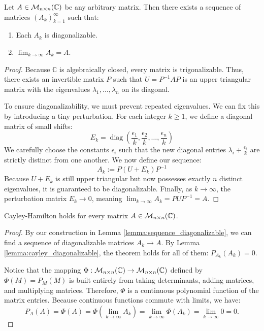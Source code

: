 \begin{lemma}\label{lemma:sequence_diagonalizable}
  Let $A \in \mathcal{M}_{n \times n}(\mathbb{C})$ be any arbitrary matrix. Then there exists a sequence of matrices $(A_k)_{k=1}^\infty$ such that:
  \begin{enumerate}
    \item Each $A_k$ is diagonalizable.
    \item $\lim_{k \to \infty} A_k = A$.
  \end{enumerate}
\end{lemma}

\begin{proof}
  Because $\mathbb{C}$ is algebraically closed, every matrix is trigonalizable. Thus, there exists an invertible matrix $P$ such that $U = P^{-1} A P$ is an upper triangular matrix with the eigenvalues $\lambda_1, \dots, \lambda_n$ on its diagonal.

  To ensure diagonalizability, we must prevent repeated eigenvalues. We can fix this by introducing a tiny perturbation. For each integer $k \ge 1$, we define a diagonal matrix of small shifts:
  \[
  E_k = \operatorname{diag}\left(\frac{\epsilon_1}{k}, \frac{\epsilon_2}{k}, \dots, \frac{\epsilon_n}{k}\right)
  \]
  We carefully choose the constants $\epsilon_i$ such that the new diagonal entries $\lambda_i + \frac{\epsilon_i}{k}$ are strictly distinct from one another. We now define our sequence:
  \[
  A_k := P (U + E_k) P^{-1}
  \]
  Because $U + E_k$ is still upper triangular but now possesses exactly $n$ distinct eigenvalues, it is guaranteed to be diagonalizable. Finally, as $k \to \infty$, the perturbation matrix $E_k \to 0$, meaning $\lim_{k \to \infty} A_k = P U P^{-1} = A$.
\end{proof}

\begin{lemma}\label{lemma:cayley_C}
  Cayley-Hamilton holds for every matrix $A \in \mathcal{M}_{n \times n}(\mathbb{C})$.
\end{lemma}

\begin{proof}
  By our construction in Lemma \ref{lemma:sequence_diagonalizable}, we can find a sequence of diagonalizable matrices $A_k \to A$. By Lemma \ref{lemma:cayley_diagonalizable}, the theorem holds for all of them: $P_{A_k}(A_k) = 0$.

  Notice that the mapping $\Phi: \mathcal{M}_{n \times n}(\mathbb{C}) \to \mathcal{M}_{n \times n}(\mathbb{C})$ defined by $\Phi(M) = P_M(M)$ is built entirely from taking determinants, adding matrices, and multiplying matrices. Therefore, $\Phi$ is a continuous polynomial function of the matrix entries. Because continuous functions commute with limits, we have:
  \[
  P_A(A) = \Phi(A) = \Phi\left(\lim_{k \to \infty} A_k\right) = \lim_{k \to \infty} \Phi(A_k) = \lim_{k \to \infty} 0 = 0.
  \]
\end{proof}

